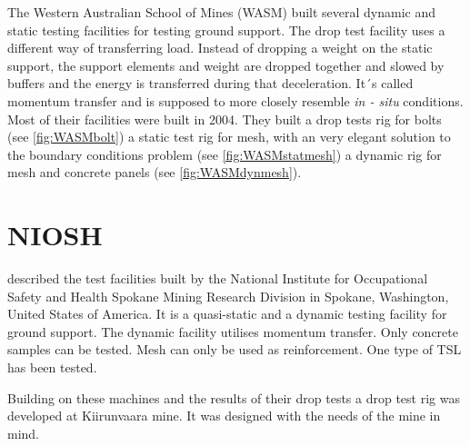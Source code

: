 The Western Australian School of Mines (WASM) built several dynamic and static testing facilities for testing ground support. The drop test facility uses a different way of transferring load. Instead of dropping a weight on the static support, the support elements and weight are dropped together and slowed by buffers and the energy is transferred during that deceleration. It´s called momentum transfer and is supposed to more closely resemble \textit{in - situ} conditions. Most of their facilities were built in 2004. They built a drop tests rig for bolts (see \autoref{fig:WASMbolt}) a static test rig for mesh, with an very elegant solution to the boundary conditions problem (see \autoref{fig:WASMstatmesh}) a dynamic rig for mesh and concrete panels (see \autoref{fig:WASMdynmesh}).

\section{NIOSH}

\textcite{Raffaldi17} described the test facilities built by 
the National Institute for Occupational Safety and Health Spokane Mining Research
Division in Spokane, Washington, United States of America. It is a quasi-static and a dynamic testing facility for ground support. The dynamic facility utilises momentum transfer. Only concrete samples can be tested. Mesh can only be used as reinforcement. One type of TSL has been tested. 






Building on these machines and the results of their drop tests a drop test rig was developed at Kiirunvaara mine. It was designed with the needs of the mine in mind.
